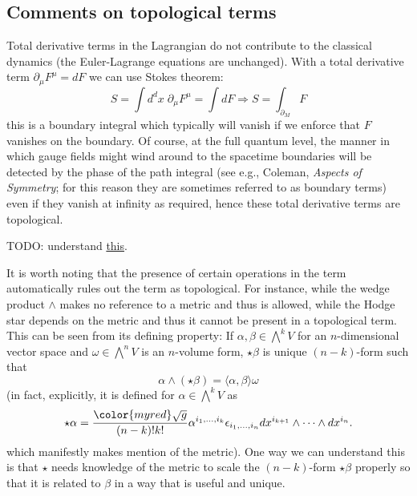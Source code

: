 \documentclass{report}
\begin{document}
\subsection{Comments on topological terms}\label{sec:total-derivatives}
 Total derivative terms in the Lagrangian do not contribute to the classical 
dynamics (the Euler-Lagrange equations are unchanged). With a total derivative 
term $ \partial_\mu F^\mu = dF $ we can use Stokes theorem:
\begin{equation*}
	S = \int d^d x \; \partial_\mu F^\mu 
		= \int d F  \Longrightarrow S = \int_{\partial_M} F 
\end{equation*}
this is a boundary integral which typically will vanish if we enforce that $ F $
vanishes on the boundary. Of course, at the full quantum level, the manner in
which gauge fields might wind around to the spacetime boundaries will be
detected by the phase of the path integral (see e.g., Coleman, \textit{Aspects
of Symmetry}; for this reason they are sometimes referred to as boundary terms)
even if they vanish at infinity as required, hence these total derivative terms
are topological. 

TODO: understand \href{https://physics.stackexchange.com/questions/262660/two-definitions-of-topological-terms-in-field-theory}{this}.

 It is worth noting that the presence 
of certain operations in the term automatically rules out the term as topological. 
For instance, while the wedge product $ \wedge $ makes no reference to a metric 
and thus is allowed, while the Hodge star depends on the metric and thus it
cannot be present in a topological term. This can be seen from its defining 
property: If $ \alpha,\beta \in \bigwedge^k V $ for an $ n $-dimensional vector 
space and $ \omega \in \bigwedge^n V $ is an $ n $-volume form, $ \star\beta $ 
is unique $ (n-k)$-form such that 
\begin{equation*}
	\alpha \wedge (\star \beta) = \langle \alpha,\beta \rangle \omega
\end{equation*}
(in fact, explicitly, it is defined for $ \alpha\in \bigwedge^k V $ as
\begin{equation*}
	\star\alpha 
		= \frac{\color{myred}\sqrt{g}}{(n-k)! k!} 
			\alpha^{i_1,\dots,i_k}\epsilon_{i_1, \dots, i_n}
				dx^{i_{k+1}}\wedge \cdots \wedge dx^{i_n}.
\end{equation*}
which manifestly makes mention of the metric). One way we can understand this 
is that $ \star $ needs knowledge of the metric to scale the $ (n-k) $-form 
$ \star\beta $ properly so that it is related to $ \beta $ in a way that is 
useful and unique.
\end{document}
